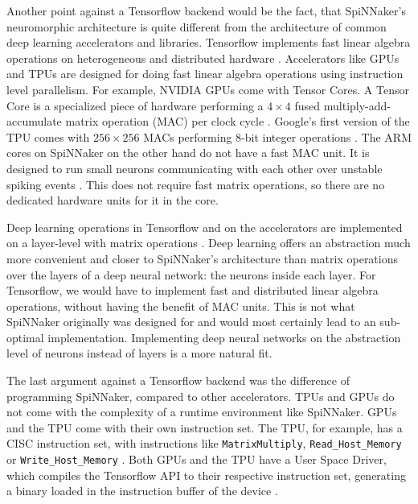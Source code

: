 \documentclass{article}
\begin{document}
Another point against a Tensorflow backend would be
the fact, that SpiNNaker's neuromorphic architecture is
quite different from the architecture of common deep
learning accelerators and libraries.
Tensorflow implements fast linear algebra operations on
heterogeneous and distributed hardware \citep{tf2015}.
Accelerators like GPUs and TPUs are designed for doing
fast linear algebra operations using instruction level parallelism.
For example, NVIDIA GPUs come with Tensor Cores.
A Tensor Core is a specialized piece of hardware performing a
$4\times4$ fused multiply-add-accumulate matrix operation (MAC) per
clock cycle \citep{markidis_et_al_2018}.
Google's first version of the TPU comes with $256\times256$ MACs
performing 8-bit integer operations \citep{tpus}.
The ARM cores on SpiNNaker on the other hand do not have a fast MAC
unit.
It is designed to run small neurons communicating with each other over
unstable spiking events \citep{furber_et_al_2007}.
This does not require fast matrix operations, so there are no
dedicated hardware units for it in the core.

Deep learning operations in Tensorflow and on the accelerators are
implemented on a layer-level with matrix operations
\citep{goodfellow2016}.
Deep learning offers an abstraction much more convenient
and closer to SpiNNaker's architecture than matrix
operations over the layers of a deep neural network: the
neurons inside each layer.
For Tensorflow, we would have to implement fast and
distributed linear algebra operations, without having the benefit
of MAC units.
This is not what SpiNNaker originally was designed for and would
most certainly lead to an sub-optimal implementation.
Implementing deep neural networks on the abstraction level of neurons
instead of layers is a more natural fit.

The last argument against a Tensorflow backend was the difference of
programming SpiNNaker, compared to other accelerators.
TPUs and GPUs do not come with the complexity of a runtime environment
like SpiNNaker.
GPUs and the TPU come with their own instruction set.
The TPU, for example, has a CISC instruction set, with instructions
like \texttt{MatrixMultiply}, \texttt{Read\_Host\_Memory} or
\texttt{Write\_Host\_Memory} \citep{tpus}.
Both GPUs and the TPU have a User Space Driver, which compiles the
Tensorflow API to their respective instruction set, generating a
binary loaded in the instruction buffer of the device \citep{tpus}.
\end{document}
